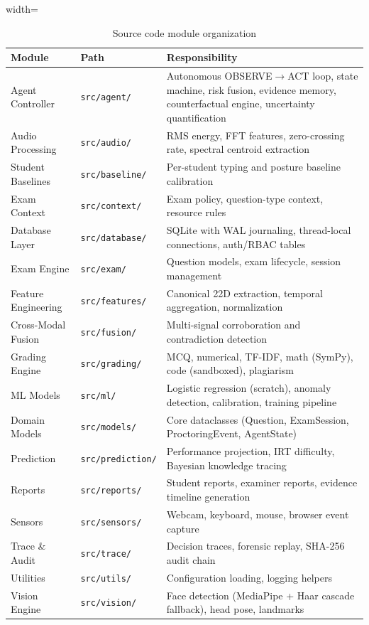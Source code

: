 \documentclass{article}
\begin{document}
\begin{table}[H]
\centering
\caption{Source code module organization}
\label{tab:modules}
\begin{adjustbox}{width=\textwidth}
\begin{tabular}{l l p{8cm}}
\toprule
\textbf{Module} & \textbf{Path} & \textbf{Responsibility} \\
\midrule
Agent Controller & \texttt{src/agent/} & Autonomous OBSERVE$\rightarrow$ACT loop, state machine, risk fusion, evidence memory, counterfactual engine, uncertainty quantification \\
Audio Processing & \texttt{src/audio/} & RMS energy, FFT features, zero-crossing rate, spectral centroid extraction \\
Student Baselines & \texttt{src/baseline/} & Per-student typing and posture baseline calibration \\
Exam Context & \texttt{src/context/} & Exam policy, question-type context, resource rules \\
Database Layer & \texttt{src/database/} & SQLite with WAL journaling, thread-local connections, auth/RBAC tables \\
Exam Engine & \texttt{src/exam/} & Question models, exam lifecycle, session management \\
Feature Engineering & \texttt{src/features/} & Canonical 22D extraction, temporal aggregation, normalization \\
Cross-Modal Fusion & \texttt{src/fusion/} & Multi-signal corroboration and contradiction detection \\
Grading Engine & \texttt{src/grading/} & MCQ, numerical, TF-IDF, math (SymPy), code (sandboxed), plagiarism \\
ML Models & \texttt{src/ml/} & Logistic regression (scratch), anomaly detection, calibration, training pipeline \\
Domain Models & \texttt{src/models/} & Core dataclasses (Question, ExamSession, ProctoringEvent, AgentState) \\
Prediction & \texttt{src/prediction/} & Performance projection, IRT difficulty, Bayesian knowledge tracing \\
Reports & \texttt{src/reports/} & Student reports, examiner reports, evidence timeline generation \\
Sensors & \texttt{src/sensors/} & Webcam, keyboard, mouse, browser event capture \\
Trace \& Audit & \texttt{src/trace/} & Decision traces, forensic replay, SHA-256 audit chain \\
Utilities & \texttt{src/utils/} & Configuration loading, logging helpers \\
Vision Engine & \texttt{src/vision/} & Face detection (MediaPipe + Haar cascade fallback), head pose, landmarks \\
\bottomrule
\end{tabular}
\end{adjustbox}
\end{table}
\end{document}
